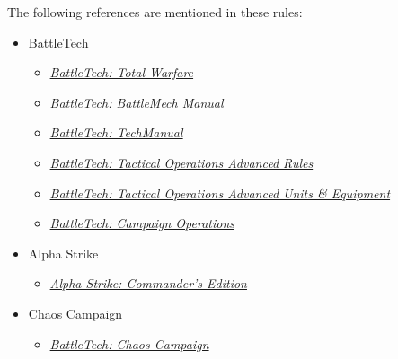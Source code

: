 The following references are mentioned in these rules:

\begin{itemize}

  \item BattleTech

  \begin{itemize}

    \item \emph{\href{https://store.catalystgamelabs.com/products/battletech-total-warfare-pdf}{BattleTech: Total Warfare}}

    \item \emph{\href{https://store.catalystgamelabs.com/products/battletech-battlemech-manual-book-pdf-combo}{BattleTech: BattleMech Manual}}

    \item \emph{\href{https://store.catalystgamelabs.com/products/battletech-techmanual-book-pdf}{BattleTech: TechManual}}

    \item \emph{\href{https://store.catalystgamelabs.com/products/battletech-tactical-operations-advanced-rules}{BattleTech: Tactical Operations Advanced Rules}}

    \item \emph{\href{https://store.catalystgamelabs.com/products/battletech-tactical-operations-advanced-units-equipement}{BattleTech: Tactical Operations Advanced Units \& Equipment}}

    \item \emph{\href{https://store.catalystgamelabs.com/products/battletech-campaign-operations-pdf}{BattleTech: Campaign Operations}}

  \end{itemize}

  \item Alpha Strike

  \begin{itemize}

    \item \emph{\href{https://store.catalystgamelabs.com/products/battletech-alpha-strike-commanders-edition}{Alpha Strike: Commander's Edition}}

  \end{itemize}

  \item Chaos Campaign

  \begin{itemize}

    \item \emph{\href{http://bg.battletech.com/download/CAT35600_ChaosCampaign_Rulebook.pdf}{BattleTech: Chaos Campaign}}


\end{itemize}
\end{itemize}
